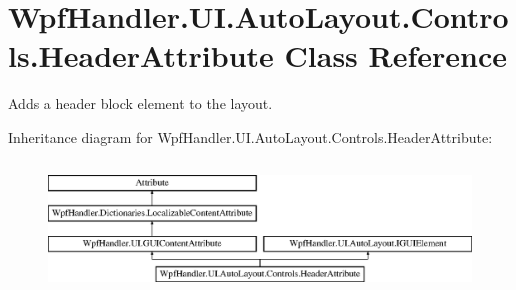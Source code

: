 \hypertarget{class_wpf_handler_1_1_u_i_1_1_auto_layout_1_1_controls_1_1_header_attribute}{}\section{Wpf\+Handler.\+U\+I.\+Auto\+Layout.\+Controls.\+Header\+Attribute Class Reference}
\label{class_wpf_handler_1_1_u_i_1_1_auto_layout_1_1_controls_1_1_header_attribute}


Adds a header block element to the layout.  


Inheritance diagram for Wpf\+Handler.\+U\+I.\+Auto\+Layout.\+Controls.\+Header\+Attribute\+:\begin{figure}[H]
\begin{center}
\leavevmode
\includegraphics[height=3.544304cm]{d1/d32/class_wpf_handler_1_1_u_i_1_1_auto_layout_1_1_controls_1_1_header_attribute}
\end{center}
\end{figure}

